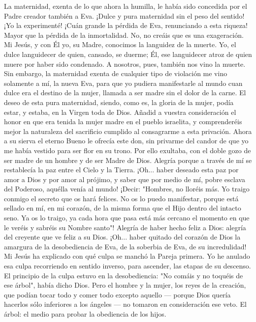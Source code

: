 \documentclass[12pt]{book} %
\begin{document}
La maternidad, exenta de lo que ahora la humilla, le había sido concedida por el Padre creador también a Eva. ¡Dulce y 
pura maternidad sin el peso del sentido! ¡Yo la experimenté! ¡Cuán grande la pérdida de Eva, renunciando a esta riqueza! Mayor que la pérdida de la inmortalidad. No, no creáis que es una exageración. Mi Jesús, y con Él yo, su Madre, conocimos la languidez de la muerte. Yo, el dulce languidecer de quien, cansado, se duerme; Él, ese languidecer atroz de quien muere por haber sido condenado. A nosotros, pues, también nos vino la muerte. Sin embargo, la maternidad exenta de cualquier tipo de violación me vino solamente a mí, la nueva Eva, para que yo pudiera manifestarle al mundo cuan dulce era el destino de la mujer, llamada a ser madre sin el dolor de la carne. El deseo de esta pura maternidad, siendo, como es, la gloria de la mujer, podía estar, y estaba, en la Virgen toda de Dios. Añadid a vuestra consideración el honor en que era tenida la mujer madre en el pueblo israelita, y comprenderéis mejor la naturaleza del sacrificio cumplido al consagrarme a esta privación. 
Ahora a su sierva el eterno Bueno le ofrecía este don, sin privarme del candor de que yo me había vestido para ser flor 
en su trono. Por ello exultaba, con el doble gozo de ser madre de un hombre y de ser Madre de Dios. 
Alegría porque a través de mí se restablecía la paz entre el Cielo y la Tierra. 
¡Oh... haber deseado esta paz por amor a Dios y por amor al prójimo, y saber que por medio de mí, pobre esclava del Poderoso, aquélla venía al mundo! ¡Decir: "Hombres, no lloréis más. Yo traigo conmigo el secreto que os hará felices. No os lo puedo manifestar, porque está sellado en mí, en mi corazón, de la misma forma que el Hijo dentro del intacto seno. Ya os lo traigo, ya cada hora que pasa está más cercano el momento en que le veréis y sabréis su Nombre santo"! 
Alegría de haber hecho feliz a Dios: alegría del creyente que ve feliz a su Dios. 
¡Oh... haber quitado del corazón de Dios la amargura de la desobediencia de Eva, de la soberbia de Eva, de su 
incredulidad! 
Mi Jesús ha explicado con qué culpa se manchó la Pareja primera. Yo he anulado esa culpa recorriendo en sentido 
inverso, para ascender, las etapas de su descenso. 
El principio de la culpa estuvo en la desobediencia: "No comáis y no toquéis de ese árbol", había dicho Dios. Pero el 
hombre y la mujer, los reyes de la creación, que podían tocar todo y comer todo excepto aquello — porque Dios quería hacerlos sólo inferiores a los ángeles — no tomaron en consideración ese veto. 
El árbol: el medio para probar la obediencia de los hijos. 
\end{document}
